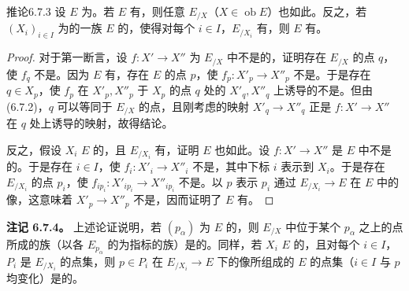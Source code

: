 \begin{SGAresult}{推论}{6.7.3}
设 $E$ 为。若 $E$ 有，则任意 $E_{/X}$（$X\in\operatorname{ob}E$）也如此。反之，若 $(X_i)_{i\in I}$ 为的一族 $E$ 的，使得对每个 $i\in I$，$E_{/X_i}$ 有，则 $E$ 有。
\end{SGAresult}
\begin{proof}
对于第一断言，设 $f:X'\to X''$ 为 $E_{/X}$ 中不是的，证明存在 $E_{/X}$ 的点 $q$，使 $f_q$ 不是。因为 $E$ 有，存在 $E$ 的点 $p$，使 $f_p:X'_p\to X''_p$ 不是。于是存在 $q\in X_p$，使 $f_p$ 在 $X'_p,X''_p$ 于 $X_p$ 的点 $q$ 处的 $X'_q,X''_q$ 上诱导的不是。但由 (6.7.2)，$q$ 可以等同于 $E_{/X}$ 的点，且刚考虑的映射 $X'_q\to X''_q$ 正是 $f:X'\to X''$ 在 $q$ 处上诱导的映射，故得结论。

反之，假设 $X_i$  $E$ 的，且 $E_{/X_i}$ 有，证明 $E$ 也如此。设 $f:X'\to X''$ 是 $E$ 中不是的。于是存在 $i\in I$，使 $f_i:X'_i\to X''_i$
不是，其中下标 $i$ 表示到 $X_i$。于是存在 $E_{/X_i}$ 的点 $p_i$，使 $f_{ip_i}:X'_{ip_i}\to X''_{ip_i}$ 不是。以 $p$ 表示 $p_i$ 通过 $E_{/X_i}\to E$ 在 $E$ 中的像，这意味着 $X'_p\to X''_p$ 不是，因而证明了 $E$ 有。
\end{proof}

\textbf{注记 6.7.4。} 上述论证说明，若 $(p_\alpha)$ 为 $E$ 的，则 $E_{/X}$ 中位于某个 $p_\alpha$ 之上的点所成的族（以各 $E_{p_\alpha}$ 的为指标的族）是的。同样，若 $X_i$  $E$ 的，且对每个 $i\in I$，$P_i$ 是 $E_{/X_i}$ 的点集，则 $p\in P_i$ 在 $E_{/X_i}\to E$ 下的像所组成的 $E$ 的点集（$i\in I$ 与 $p$ 均变化）是的。

